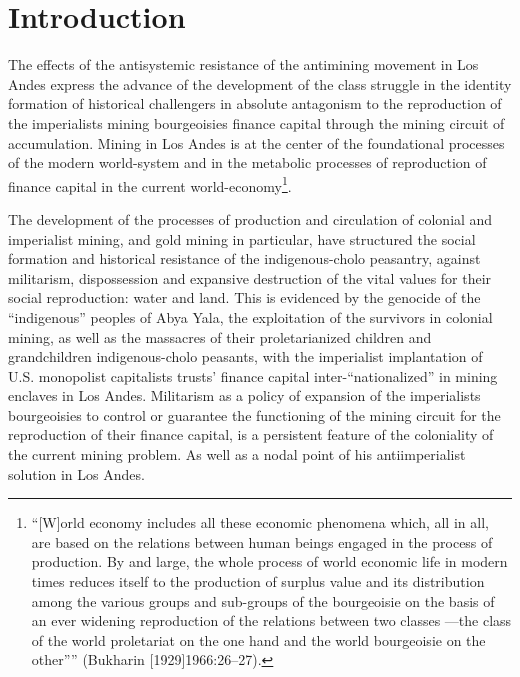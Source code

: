 \documentclass[]{interact}
\theoremstyle{plain}%
\theoremstyle{definition}
\theoremstyle{remark}
\begin{document}
\section{Introduction}
The effects of the antisystemic resistance of the antimining movement in Los Andes express the advance of the development of the class struggle in the identity formation of historical challengers in absolute antagonism to the reproduction of the imperialists mining bourgeoisies finance capital through the mining circuit of accumulation. 
Mining in Los Andes is at the center of the foundational processes of the modern world-system and in the metabolic processes of reproduction of finance capital in the current world-economy\footnote{“[W]orld economy includes all these economic phenomena which, all in all, are based on the relations between human beings engaged in the process of production. By and large, the whole process of world economic life in modern times reduces itself to the production of surplus value and its distribution among the various groups and sub-groups of the bourgeoisie on the basis of an ever widening reproduction of the relations between two classes —the class of the world proletariat on the one hand and the world bourgeoisie on the other”” (Bukharin [1929]1966:26–27).}. 

The development of the processes of production and circulation of colonial and imperialist mining, and gold mining in particular, have structured the social formation and historical resistance of the indigenous-cholo peasantry, against militarism, dispossession and expansive destruction of the vital values for their social reproduction: water and land.
This is evidenced by the genocide of the “indigenous” peoples of Abya Yala, the exploitation of the survivors in colonial mining, as well as the massacres of their proletarianized children and grandchildren indigenous-cholo peasants, with the imperialist implantation of U.S. monopolist capitalists trusts’ finance capital inter-“nationalized” in mining enclaves in Los Andes. Militarism as a policy of expansion of the imperialists bourgeoisies to control or guarantee the functioning of the mining circuit for the reproduction of their finance capital, is a persistent feature of the coloniality of the current mining problem. As well as a nodal point of his antiimperialist solution in Los Andes. 
\end{document}
